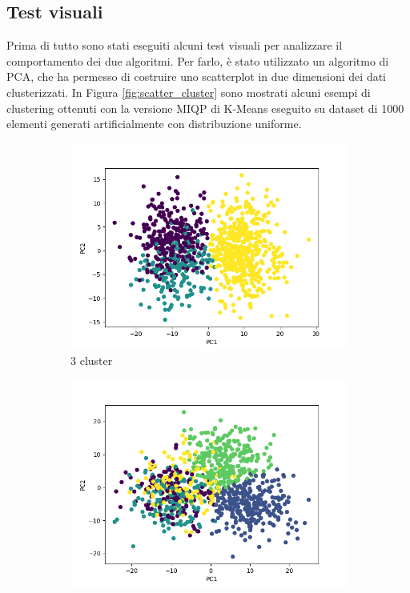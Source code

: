 \documentclass{article}
\begin{document}
    \subsection{Test visuali}
    Prima di tutto sono stati eseguiti alcuni test visuali per analizzare il comportamento dei due algoritmi. Per farlo, è stato utilizzato un algoritmo di PCA, che ha permesso di costruire uno scatterplot in due dimensioni dei dati clusterizzati. In Figura \ref{fig:scatter_cluster} sono mostrati alcuni esempi di clustering ottenuti con la versione MIQP di K-Means eseguito su dataset di 1000 elementi generati artificialmente con distribuzione uniforme.
    \begin{figure}[h]
     \centering
     \begin{subfigure}[b]{0.32\linewidth}
         \centering
         \includegraphics[width=\linewidth]{../results/plots/scatter_k3}
         \caption{3 cluster}
     \end{subfigure}
     \hfill
     \begin{subfigure}[b]{0.32\linewidth}
         \centering
         \includegraphics[width=\linewidth]{../results/plots/scatter_k5}

\end{subfigure}
\end{figure}
\end{document}
